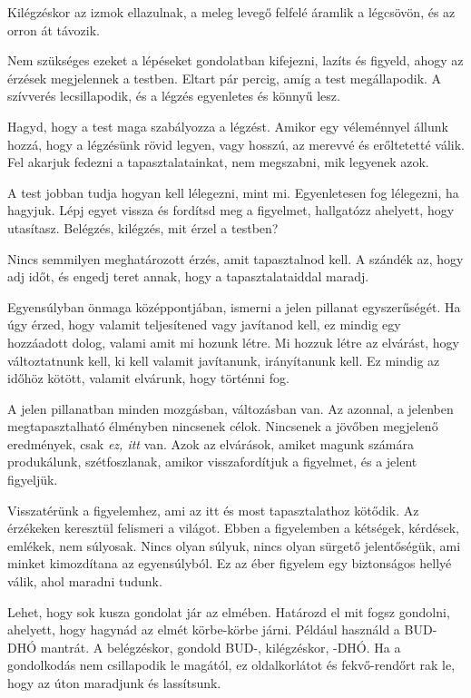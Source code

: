 \clearpage
\null\thispagestyle{empty}%
%
%
\label{illus-breathing}%
\clearpage

Kilégzéskor az izmok ellazulnak, a meleg levegő felfelé áramlik a
légcsövön, és az orron át távozik.

Nem szükséges ezeket a lépéseket gondolatban kifejezni, lazíts és
figyeld, ahogy az érzések megjelennek a testben. Eltart pár percig, amíg
a test megállapodik. A szívverés lecsillapodik, és a légzés egyenletes
és könnyű lesz.

Hagyd, hogy a test maga szabályozza a légzést. Amikor egy véleménnyel
állunk hozzá, hogy a légzésünk rövid legyen, vagy hosszú, az merevvé és
erőltetetté válik. Fel akarjuk fedezni a tapasztalatainkat, nem
megszabni, mik legyenek azok.

A test jobban tudja hogyan kell lélegezni, mint mi. Egyenletesen fog
lélegezni, ha hagyjuk. Lépj egyet vissza és fordítsd meg a figyelmet,
hallgatózz ahelyett, hogy utasítasz. Belégzés, kilégzés, mit érzel a
testben?

Nincs semmilyen meghatározott érzés, amit tapasztalnod kell. A szándék
az, hogy adj időt, és engedj teret annak, hogy a tapasztalataiddal
maradj.

Egyensúlyban önmaga középpontjában, ismerni a jelen pillanat
egyszerűségét. Ha úgy érzed, hogy valamit teljesítened vagy javítanod
kell, ez mindig egy hozzáadott dolog, valami amit mi hozunk létre. Mi
hozzuk létre az elvárást, hogy változtatnunk kell, ki kell valamit
javítanunk, irányítanunk kell. Ez mindig az időhöz kötött, valamit
elvárunk, hogy történni fog.

\enlargethispage*{2\baselineskip}

A jelen pillanatban minden mozgásban, változásban van. Az azonnal, a
jelenben megtapasztalható élményben nincsenek célok. Nincsenek a jövőben
megjelenő eredmények, csak \emph{ez, itt} van. Azok az elvárások, amiket
magunk számára produkálunk, szétfoszlanak, amikor visszafordítjuk a
figyelmet, és a jelent figyeljük.

Visszatérünk a figyelemhez, ami az itt és most tapasztalathoz kötődik.
Az érzékeken keresztül felismeri a világot. Ebben a figyelemben a
kétségek, kérdések, emlékek, nem súlyosak. Nincs olyan súlyuk, nincs
olyan sürgető jelentőségük, ami minket kimozdítana az egyensúlyból. Ez
az éber figyelem egy biztonságos hellyé válik, ahol maradni tudunk.

Lehet, hogy sok kusza gondolat jár az elmében. Határozd el mit fogsz
gondolni, ahelyett, hogy hagynád az elmét körbe-körbe járni. Például
használd a BUD-DHÓ mantrát. A belégzéskor, gondold BUD-, kilégzéskor,
-DHÓ. Ha a gondolkodás nem csillapodik le magától, ez oldalkorlátot és
fekvő-rendőrt rak le, hogy az úton maradjunk és lassítsunk.

